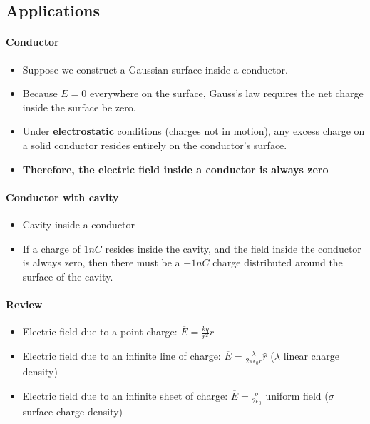 \subsection{Applications}%
\label{sub:applications}


\paragraph{Conductor}

\begin{itemize}
	\item Suppose we construct a Gaussian surface inside a conductor.
	\item Because $\overline{E}=0$ everywhere on the surface, Gauss's law
		requires the net charge inside the surface be zero.
	\item Under \textbf{electrostatic} conditions (charges not in motion), any
		excess charge on a solid conductor resides entirely on the conductor's surface.
	\item \textbf{Therefore, the electric field inside a conductor is always zero}
\end{itemize}
\paragraph{Conductor with cavity}


\begin{itemize}
	\item Cavity inside a conductor
	\item If a charge of $1nC$ resides inside the cavity, and the field inside the conductor
		is always zero, then there must be a $-1nC$ charge distributed around the surface
		of the cavity.
\end{itemize}

\paragraph{Review}
\begin{itemize}
	\item Electric field due to a point charge: $\overline{E} = \frac{kq}{r^2}\hat{r}$
	\item Electric field due to an infinite line of charge: $\overline{E} = \frac{\lambda}{2\pi \epsilon_0 r} \hat{r}$
		($\lambda $ linear charge density)
	\item Electric field due to an infinite sheet of charge: $\overline{E} = \frac{\sigma}{2 \epsilon_0}$ uniform field
		($\sigma$ surface charge density)
\end{itemize}

